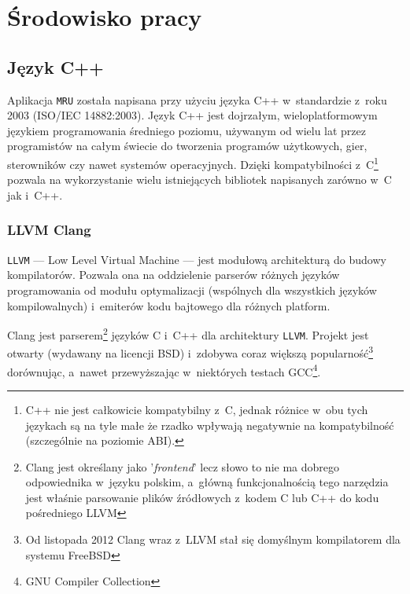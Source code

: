 \chapter{Środowisko pracy}

\section{Język C++}
\par
Aplikacja \texttt{MRU} została napisana przy użyciu języka C++ w~standardzie z~roku 2003 (ISO/IEC 14882:2003).
Język C++ jest dojrzałym, wieloplatformowym językiem programowania średniego poziomu, używanym od wielu lat przez programistów na całym świecie do tworzenia programów użytkowych, gier, sterowników czy nawet systemów operacyjnych. Dzięki kompatybilności z~C\footnote{C++ nie jest całkowicie kompatybilny z~C, jednak różnice w~obu tych językach są na tyle małe że rzadko wpływają negatywnie na kompatybilność (szczególnie na poziomie ABI).} pozwala na wykorzystanie wielu istniejących bibliotek napisanych zarówno w~C jak i~C++\cite{thinking-in-cpp}.

\subsection{LLVM Clang}
\par
\texttt{LLVM} --- Low Level Virtual Machine --- jest modułową architekturą do budowy kompilatorów. Pozwala ona na oddzielenie parserów różnych języków programowania od modułu optymalizacji (wspólnych dla wszystkich języków kompilowalnych) i~emiterów kodu bajtowego dla różnych platform.

\par
Clang jest parserem\footnote{Clang jest określany jako '\textit{frontend}' lecz słowo to nie ma dobrego odpowiednika w~języku polskim, a~główną funkcjonalnością tego narzędzia jest właśnie parsowanie plików źródłowych z~kodem C lub C++ do kodu pośredniego LLVM} języków C i~C++ dla architektury \texttt{LLVM}. Projekt jest otwarty (wydawany na licencji BSD) i~zdobywa coraz większą popularność\footnote{Od listopada 2012 Clang wraz z~LLVM stał się domyślnym kompilatorem dla systemu FreeBSD} dorównując, a~nawet przewyższając w~niektórych testach GCC\footnote{GNU Compiler Collection}.

